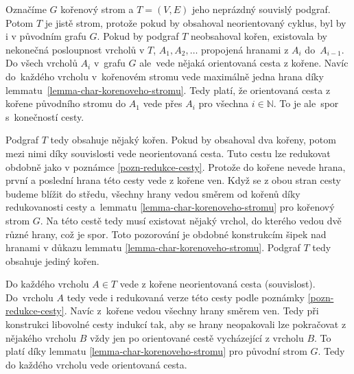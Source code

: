 \begin{dukaz}
    Označíme $G$ kořenový strom a $T = (V,E)$ jeho neprázdný souvislý podgraf. Potom $T$ je jistě strom, protože pokud by obsahoval neorientovaný cyklus, byl by i v původním grafu $G$. Pokud by podgraf $T$ neobsahoval kořen, existovala by nekonečná posloupnost vrcholů v $T$, $A_1, A_2, \dots$ propojená hranami z $A_i$ do~$A_{i-1}$. Do všech vrcholů $A_i$ v~grafu $G$ ale~vede nějaká orientovaná cesta z kořene. Navíc do~každého vrcholu v~kořenovém stromu vede maximálně jedna hrana díky lemmatu~\ref{lemma-char-korenoveho-stromu}. Tedy platí, že orientovaná cesta z kořene původního stromu do $A_1$ vede přes $A_i$ pro všechna $i \in \mathbb{N}$. To je ale~spor s~konečností cesty. 

    Podgraf $T$ tedy obsahuje nějaký kořen. Pokud by obsahoval dva kořeny, potom mezi nimi díky souvislosti vede neorientovaná cesta. Tuto cestu lze redukovat obdobně jako v poznámce \ref{pozn-redukce-cesty}. Protože do kořene nevede hrana, první a poslední hrana této cesty vede z kořene ven. Když se z obou stran cesty budeme blížit do středu, všechny hrany vedou směrem od kořenů díky redukovanosti cesty a~lemmatu \ref{lemma-char-korenoveho-stromu} pro kořenový strom $G$. Na této cestě tedy musí existovat nějaký vrchol, do kterého vedou dvě různé hrany, což je spor. Toto pozorování je obdobné konstrukcím šipek nad hranami v důkazu lemmatu \ref{lemma-char-korenoveho-stromu}. Podgraf $T$ tedy obsahuje jediný kořen.
    
    Do každého vrcholu $A \in T$ vede z kořene neorientovaná cesta (souvislost). Do~vrcholu $A$ tedy vede i redukovaná verze této cesty podle poznámky \ref{pozn-redukce-cesty}. Navíc z~kořene vedou všechny hrany směrem ven. Tedy při konstrukci libovolné cesty indukcí tak, aby se  hrany neopakovali lze pokračovat z nějakého vrcholu $B$ vždy jen po orientované cestě vycházející z vrcholu $B$. To platí díky lemmatu \ref{lemma-char-korenoveho-stromu} pro původní strom $G$. Tedy do každého vrcholu vede orientovaná cesta.
    
    
\end{dukaz}

